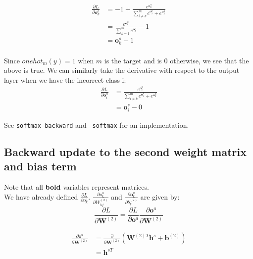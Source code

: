 \documentclass[reqno]{amsart}
\theoremstyle{definition}
\theoremstyle{remark}
\numberwithin{equation}{section}
\begin{document}
\begin{align}
    \frac{\partial L}{\partial \mathbf{o}_k^a} &=
        -1 + \frac{e^{\mathbf{o}_k^a}}{\sum_{i \neq k}^m e^{\mathbf{o}_i^a} + e^{\mathbf{o}_k^a}} \\
    &= \frac{e^{\mathbf{o}_k^a}}{\sum_{k=1}^m e^{\mathbf{o}_k^a}} -1 \\
    &= \mathbf{o}^s_k - 1
\end{align} \\

Since $onehot_m(y) = 1$ when $m$ is the target and is $0$ otherwise, we see that the above is true. We can similarly take the derivative with respect to the output layer when we have the incorrect class i: \\

\begin{align}
    \frac{\partial L}{\partial \mathbf{o}_i^a} &=
        \frac{e^{\mathbf{o}_i^a}}{\sum_{i \neq k}^m e^{\mathbf{o}_i^a} + e^{\mathbf{o}_k^a}} \\
    &= \mathbf{o}^s_i - 0
\end{align}

See \texttt{softmax\_backward} and \texttt{\_softmax} for an implementation.

\subsection{Backward update to the second weight matrix and bias term}

Note that all \textbf{bold} variables represent matrices. \\

We have already defined $\frac{\partial L}{\partial o^a_k}$. $\frac{\partial o_k^a}{\partial W_{kj}^{(2)}}$ and $\frac{\partial \mathbf{o}_k^a}{\partial b_k^{(2)}}$ are given by:\\

\begin{equation}
    \frac{\partial L}{\partial \mathbf{W}^{(2)}} = \frac{\partial L}{\partial \mathbf{o}^a}\frac{\partial \mathbf{o}^a}{\partial \mathbf{W}^{(2)}}
\end{equation}

\begin{align}
    \frac{\partial \mathbf{o}^a}{\partial \mathbf{W}^{(2)}} &= \frac{\partial}{\partial \mathbf{W}^{(2)}} (\mathbf{W}^{(2)T} \mathbf{h}^s + \mathbf{b}^{(2)}) \\
    &= \mathbf{h}^{sT}
\end{align}
\end{document}
